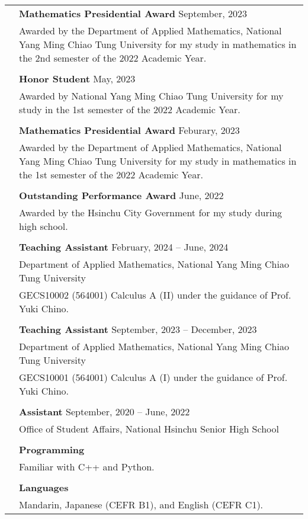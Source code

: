 \documentclass[letterpaper, 11pt]{article}
\begin{document}
\begin{longtable}{p{0.8in}p{5.5in}}
{\color{OliveGreen}{Honors}} 
& \textbf{Mathematics Presidential Award} \hfill September, 2023\\
& Awarded by the Department of Applied Mathematics, National Yang Ming Chiao Tung University for my study in mathematics in the 2nd semester of the 2022 Academic Year.\\
& \\
& \textbf{Honor Student} \hfill May, 2023\\
& Awarded by National Yang Ming Chiao Tung University for my study in the 1st semester of the 2022 Academic Year. \\
& \\
& \textbf{Mathematics Presidential Award} \hfill Feburary, 2023\\
& Awarded by the Department of Applied Mathematics, National Yang Ming Chiao Tung University for my study in mathematics in the 1st semester of the 2022 Academic Year.\\
& \\
& \textbf{Outstanding Performance Award} \hfill June, 2022\\
& Awarded by the Hsinchu City Government for my study during high school.\\
& \\


{\color{OliveGreen}{Work}} 
& \textbf{Teaching Assistant}  \hfill February, 2024 -- June, 2024 \\
{\color{OliveGreen}{Experience}} 
& Department of Applied Mathematics, National Yang Ming Chiao Tung University\\
& GECS10002 (564001) Calculus A (II) under the guidance of Prof. Yuki Chino. \\
& \\

& \textbf{Teaching Assistant} \hfill September, 2023 -- December, 2023 \\
& Department of Applied Mathematics, National Yang Ming Chiao Tung University\\
& GECS10001 (564001) Calculus A (I) under the guidance of Prof. Yuki Chino.\\
& \\

& \textbf{Assistant} \hfill September, 2020 -- June, 2022 \\
& Office of Student Affairs, National Hsinchu Senior High School\\
& \\


{\color{OliveGreen}{Skills}} 
& \textbf{Programming}\\
& Familiar with C++ and Python. \\
& \\

& \textbf{Languages} \\
& Mandarin, Japanese (CEFR B1), and English (CEFR C1). \\


\end{longtable}
\end{document}
